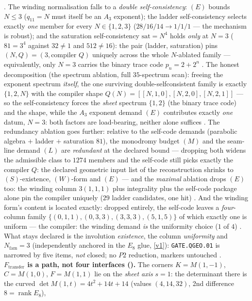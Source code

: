 \documentclass[11pt,a4paper]{article}
\newcommand{\Nfam}{N_{\mathrm{fam}}}
\theoremstyle{definition}
\begin{document}
\begin{winbox}
\mE.  The winding normalisation falls to a \emph{double self-consistency}: $(E)$ bounds
$N\le3$ ($q_{11}=N$ must itself be an $A_3$ exponent); the ladder self-consistency selects
exactly \emph{one} member for every $N\in\{1,2,3\}$ ($28/16/14\to1/1/1$ --- the mechanism is
robust); and the saturation self-consistency $\mathrm{sat}=N^4$ holds \emph{only} at $N=3$
($81=3^4$ against $32\neq1$ and $512\neq16$): the pair (ladder, saturation) pins
$(N,Q)=(3,\text{compiler }Q)$ uniquely across the whole $N$-ablated family --- equivalently,
only $N=3$ carries the binary trace code $p_n=2+2^n$ \mE.  The honest decomposition (the
spectrum ablation, full $35$-spectrum scan): freeing the exponent spectrum \emph{itself}, the
one surviving double-selfconsistent family is exactly $\{1,2,N\}$ with the compiler shape
$Q(N)=[[N,1,0],[N,2,0],[N,2,1]]$ --- so the self-consistency forces the \emph{sheet} spectrum
$\{1,2\}$ (the binary trace code) and the shape, while the $A_3$ exponent demand $(E)$
contributes exactly \emph{one} datum, $N=3$: both factors are load-bearing, neither alone
suffices \mE.  The redundancy ablation goes further: relative to the self-code demands
(parabolic algebra $+$ ladder $+$ saturation $81$), the monodromy budget $(M)$ and the
seam-line demand $(L)$ are \emph{redundant} at the declared bound --- dropping both widens the
admissible class to $1274$ members and the self-code still picks exactly the compiler $Q$: the
declared geometric input list of the reconstruction shrinks to $(S)$-existence, $(W)$-form and
$(E)$ --- and the \emph{maximal} ablation drops $(E)$ too: the winding column $3(1,1,1)$ plus
integrality plus the self-code package alone pin the compiler uniquely ($29$ ladder candidates,
one hit) \mE.  And the winding form's content is located exactly: dropped entirely, the
self-code leaves a \emph{four}-column family $\{(0,1,1),(0,3,3),(3,3,3),(5,1,5)\}$ of which
exactly one is uniform --- the compiler: the winding demand \emph{is} the uniformity choice
($1$ of $4$) \mE.  What stays declared is the involution \emph{existence}, the column
\emph{uniformity} and $\Nfam=3$ (independently anchored in the $E_8$ glue, \vref{v1}):
\texttt{GATE.QGEO.01} is narrowed by five items, \emph{not} closed; no $P2$ reduction,
markers untouched \mC.
\smallskip\\
\noindent\textbf{$F_{\mathrm{transfer}}$ is a path, not four interfaces ().}
The corners $K{=}M(1,{-}1)$, $C{=}M(1,0)$, $F{=}M(1,1)$ lie on the \emph{sheet axis} $s{=}1$: the determinant
there is the curved $\det M(1,t)=4t^2{+}14t{+}14$ (values $(4,14,32)$, 2nd difference $8{=}\operatorname{rank}E_8$),

\end{winbox}
\end{document}

